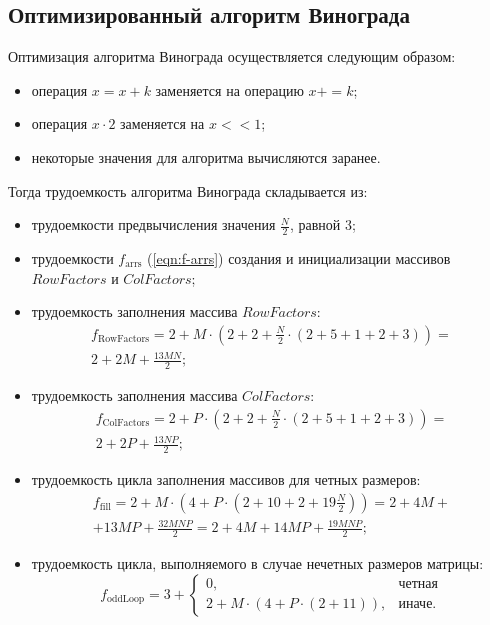 \subsection{Оптимизированный алгоритм Винограда}

Оптимизация алгоритма Винограда осуществляется следующим образом:
\begin{itemize}
    \item операция $x = x + k$ заменяется на операцию $x += k$;
    \item операция $x \cdot 2$ заменяется на $x << 1$;
    \item некоторые значения для алгоритма вычисляются заранее.
\end{itemize}

Тогда трудоемкость алгоритма Винограда складывается из:
\begin{itemize}
    \item трудоемкости предвычисления значения $\frac{N}{2}$, равной 3;
    \item трудоемкости $f_\text{arrs}$ (\ref{eqn:f-arrs}) создания и инициализации массивов $RowFactors$ и $ColFactors$;
    \item трудоемкость заполнения массива $RowFactors$:
    \begin{equation}
        \begin{gathered}
            f_\text{RowFactors} = 2 + M \cdot (2 + 2 + \frac{N}{2} \cdot (2 + 5 + 1 + 2 + 3)) = \\
            2 + 2M + \frac{13MN}{2};
        \end{gathered}
    \end{equation}
    \item трудоемкость заполнения массива $ColFactors$:
    \begin{equation}
        \begin{gathered}
            f_\text{ColFactors} = 2 + P \cdot (2 + 2 + \frac{N}{2} \cdot (2 + 5 + 1 + 2 + 3)) = \\
            2 + 2P + \frac{13NP}{2};
        \end{gathered}
    \end{equation}
    \item трудоемкость цикла заполнения массивов для четных размеров:
    \begin{equation}
        \begin{gathered}
            f_\text{fill} = 2 + M \cdot (4 + P \cdot (2 + 10 + 2 + 19\frac{N}{2})) = 2 + 4M + \\
            + 13MP + \frac{32MNP}{2} = 2 + 4M + 14MP + \frac{19MNP}{2};
        \end{gathered}
    \end{equation}
    \item трудоемкость цикла, выполняемого в случае нечетных размеров матрицы:
    \begin{equation}
        f_\text{oddLoop} = 3 + 
        \begin{cases}
            0, & \text{четная} \\
            2 + M \cdot (4 + P \cdot (2 + 11)), & \text{иначе.}
        \end{cases}
    \end{equation}
\end{itemize}
